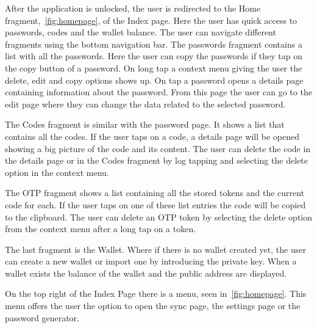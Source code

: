\documentclass[a4paper,12pt]{report}
\begin{document}
After the application is unlocked, the user is redirected to the Home
fragment,~\autoref{fig:homepage}, of the Index page. Here the user has quick
access to passwords, codes and the wallet balance. The user can navigate
different fragments using the bottom navigation bar. The passwords fragment
contains a list with all the passwords. Here the user can copy the passwords if
they tap on the copy button of a password. On long tap a context menu giving
the user the delete, edit and copy options shows up. On tap a password opens a
details page containing information about the password. From this page the user
can go to the edit page where they can change the data related to the selected
password.

The Codes fragment is similar with the password page. It shows a list that
contains all the codes. If the user taps on a code, a details page will be
opened showing a big picture of the code and its content. The user can delete
the code in the details page or in the Codes fragment by log tapping and
selecting the delete option in the context menu.

The OTP fragment shows a list containing all the stored tokens and the current
code for each. If the user taps on one of these list entries the code will be
copied to the clipboard. The user can delete an OTP token by selecting the
delete option from the context menu after a long tap on a token.

The last fragment is the Wallet. Where if there is no wallet created yet, the
user can create a new wallet or import one by introducing the private key. When
a wallet exists the balance of the wallet and the public address are displayed.

On the top right of the Index Page there is a menu, seen
in~\autoref{fig:homepage}. This menu offers the user the option to open the
sync page, the settings page or the password generator.
\end{document}
